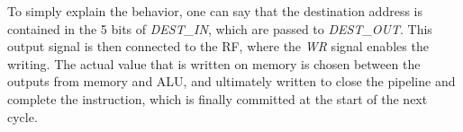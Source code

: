 To simply explain the behavior, one can say that the destination address is 
contained in the 5 bits of \textit{DEST\_IN}, which are passed to 
\textit{DEST\_OUT}. This output signal is then connected to the \textsc{RF}, 
where the \textit{WR} signal enables the writing. The actual value that is 
written on memory is chosen between the outputs from memory and ALU, and 
ultimately written to close the pipeline and complete the instruction, which is 
finally committed at the start of the next cycle.




